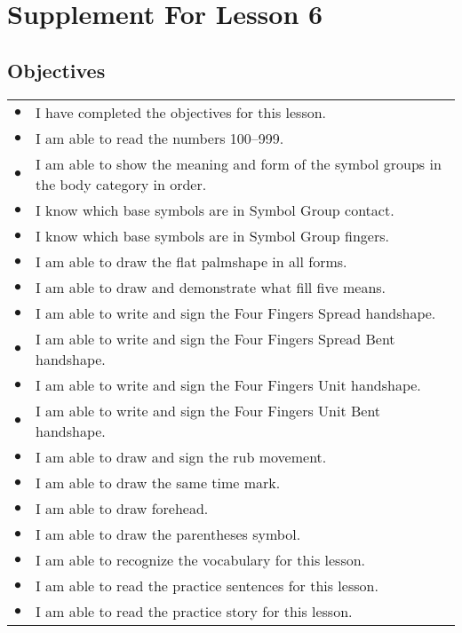 \documentclass{article}
\begin{document}
\newfontfamily{}
\newfontfamily{}
\newcommand{\bul}{\hfil$\bullet$&}
\renewenvironment{glossary}{\begin{multicols}{5}\begin{center}}{\end{center}\end{multicols}}
\setcounter{secnumdepth}{0}
\setlength{\columnseprule}{1pt}

\section{Supplement For Lesson 6}

\subsection{Objectives}

\begin{tabular}{p{1cm}p{14cm}}
\bul I have completed the objectives for this lesson.\\
\bul I am able to read the numbers 100--999.\\
\bul I am able to show the meaning and form of the symbol groups in the body category in order.\\
\bul I know which base symbols are in Symbol Group contact.\\
\bul I know which base symbols are in Symbol Group fingers.\\
\bul I am able to draw the flat palmshape in all forms.\\
\bul I am able to draw and demonstrate what fill five means.\\
\bul I am able to write and sign the Four Fingers Spread handshape.\\
\bul I am able to write and sign the Four Fingers Spread Bent handshape.\\
\bul I am able to write and sign the Four Fingers Unit handshape.\\
\bul I am able to write and sign the Four Fingers Unit Bent handshape.\\
\bul I am able to draw and sign the rub movement.\\
\bul I am able to draw the same time mark.\\
\bul I am able to draw forehead.\\
\bul I am able to draw the parentheses symbol.\\
\bul I am able to recognize the vocabulary for this lesson.\\
\bul I am able to read the practice sentences for this lesson.\\
\bul I am able to read the practice story for this lesson.\\
\end{tabular}
\end{document}
